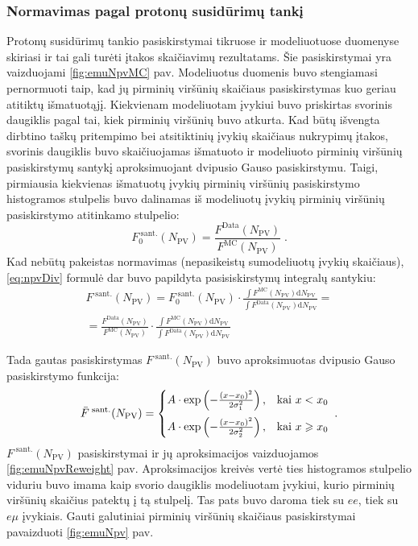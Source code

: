 \documentclass[a4paper, 12pt]{article}
\newlength\q
\begin{document}
\subsubsection{Normavimas pagal protonų susidūrimų tankį} \label{sec:PUreweight}
Protonų susidūrimų tankio pasiskirstymai tikruose ir modeliuotuose duomenyse skiriasi ir tai gali turėti įtakos skaičiavimų rezultatams. Šie pasiskirstymai yra vaizduojami \ref{fig:emuNpvMC} pav. Modeliuotus duomenis buvo stengiamasi pernormuoti taip, kad jų pirminių viršūnių skaičiaus pasiskirstymas kuo geriau atitiktų išmatuotąjį. Kiekvienam modeliuotam įvykiui buvo priskirtas svorinis daugiklis pagal tai, kiek pirminių viršūnių buvo atkurta. Kad būtų išvengta dirbtino taškų pritempimo bei atsitiktinių įvykių skaičiaus nukrypimų įtakos, svorinis daugiklis buvo skaičiuojamas išmatuoto ir modeliuoto pirminių viršūnių pasiskirstymų santykį aproksimuojant dvipusio Gauso pasiskirstymu. Taigi, pirmiausia kiekvienas išmatuotų įvykių pirminių viršūnių pasiskirstymo histogramos stulpelis buvo dalinamas iš modeliuotų įvykių pirminių viršūnių pasiskirstymo atitinkamo stulpelio:
\begin{equation}
\label{eq:npvDiv}
F^{\mathrm{\;sant.}}_{0}(N_{\mathrm{PV}})=\frac{F^{\mathrm{Data}}(N_{\mathrm{PV}})}{F^{\mathrm{MC}}(N_{\mathrm{PV}})} \; .
\end{equation}
Kad nebūtų pakeistas normavimas (nepasikeistų sumodeliuotų įvykių skaičiaus), \eqref{eq:npvDiv} formulė dar buvo papildyta pasisiskirstymų integralų santykiu:
\begin{multline}
\label{eq:npvDivNorm}
F^{\mathrm{\;sant.}}(N_{\mathrm{PV}})=
F^{\mathrm{\;sant.}}_{0}(N_{\mathrm{PV}})\cdot
\frac{\int F^{\mathrm{MC}}(N_{\mathrm{PV}}) \mathrm{d}N_{\mathrm{PV}}}
{\int F^{\mathrm{Data}}(N_{\mathrm{PV}}) \mathrm{d}N_{\mathrm{PV}}}=
\\
=\frac{F^{\mathrm{Data}}(N_{\mathrm{PV}})}{F^{\mathrm{MC}}(N_{\mathrm{PV}})}\cdot
\frac{\int F^{\mathrm{MC}}(N_{\mathrm{PV}}) \mathrm{d}N_{\mathrm{PV}}}
{\int F^{\mathrm{Data}}(N_{\mathrm{PV}}) \mathrm{d}N_{\mathrm{PV}}}
\end{multline}

Tada gautas pasiskirstymas $F^{\mathrm{\;sant.}}(N_{\mathrm{PV}})$ buvo aproksimuotas dvipusio Gauso pasiskirstymo funkcija:
\begin{equation}
\bar{F}^{\mathrm{\;sant.}}(N_{\mathrm{PV}})=
\begin{cases} A\cdot \exp\left(-\frac{(x-x_{0})^{2}}{2\sigma_{1}^{2}}\right), & \mbox{kai } x<x_{0} \vspace{0.2cm} \\ 
A\cdot \exp\left(-\frac{(x-x_{0})^{2}}{2\sigma_{2}^{2}}\right), & \mbox{kai } x\geqslant x_{0} \end{cases} \; .
\label{eq:dGauss}
\end{equation}
$F^{\mathrm{\;sant.}}(N_{\mathrm{PV}})$ pasiskirstymai ir jų aproksimacijos vaizduojamos \ref{fig:emuNpvReweight} pav. Aproksimacijos kreivės vertė ties histogramos stulpelio viduriu buvo imama kaip svorio daugiklis modeliuotam įvykiui, kurio pirminių viršūnių skaičius patektų į tą stulpelį. Tas pats buvo daroma tiek su $ee$, tiek su $e\mu$ įvykiais. Gauti galutiniai pirminių viršūnių skaičiaus pasiskirstymai pavaizduoti \ref{fig:emuNpv} pav.
\end{document}
